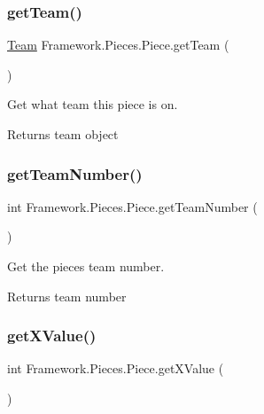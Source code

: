 \subsubsection{\texorpdfstring{get\+Team()}{getTeam()}}
{\footnotesize\ttfamily \hyperlink{class_framework_1_1_team}{Team} Framework.\+Pieces.\+Piece.\+get\+Team (\begin{DoxyParamCaption}{ }\end{DoxyParamCaption})}

Get what team this piece is on.

\begin{DoxyReturn}{Returns}
team object 
\end{DoxyReturn}
\hypertarget{class_framework_1_1_pieces_1_1_piece_a89cb4d3e939ba869775df9b10845ec9f}{}\label{class_framework_1_1_pieces_1_1_piece_a89cb4d3e939ba869775df9b10845ec9f} 
\subsubsection{\texorpdfstring{get\+Team\+Number()}{getTeamNumber()}}
{\footnotesize\ttfamily int Framework.\+Pieces.\+Piece.\+get\+Team\+Number (\begin{DoxyParamCaption}{ }\end{DoxyParamCaption})}

Get the piece\textquotesingle{}s team number. \begin{DoxyReturn}{Returns}
team number 
\end{DoxyReturn}
\hypertarget{class_framework_1_1_pieces_1_1_piece_a4a7de4220140072732c013bb7c880022}{}\label{class_framework_1_1_pieces_1_1_piece_a4a7de4220140072732c013bb7c880022} 
\subsubsection{\texorpdfstring{get\+X\+Value()}{getXValue()}}
{\footnotesize\ttfamily int Framework.\+Pieces.\+Piece.\+get\+X\+Value (\begin{DoxyParamCaption}{ }\end{DoxyParamCaption})}

